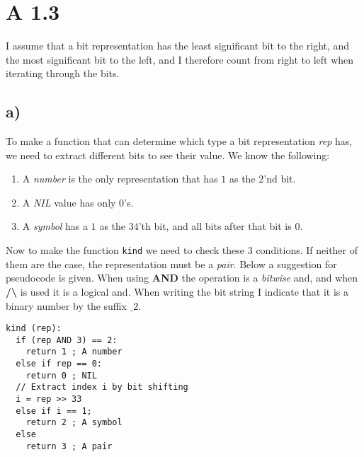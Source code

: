 \section*{A 1.3}
I assume that a bit representation has the least significant bit to the right, and the most significant bit to the left, and I therefore count from right to left when iterating through the bits.

\subsection*{a)}
To make a function that can determine which type a bit representation \textit{rep} has, we need to extract different bits to see their value. We know the following:
\begin{enumerate}
	\item A \textit{number} is the only representation that has $1$ as the $2$'nd bit.
	\item A \textit{NIL} value has only $0$'s.
	\item A \textit{symbol} has a $1$ as the $34$'th bit, and all bits after that bit is $0$.
\end{enumerate}
Now to make the function \texttt{kind} we need to check these $3$ conditions. If neither of them are the case, the representation must be a \textit{pair}. Below a suggestion for pseudocode is given. When using \textbf{AND} the operation is a \textit{bitwise} and, and when \textbf{/\textbackslash} is used it is a logical and. When writing the bit string I indicate that it is a binary number by the suffix $\_2$.
\begin{verbatim}
kind (rep):
  if (rep AND 3) == 2:
    return 1 ; A number
  else if rep == 0:
    return 0 ; NIL
  // Extract index i by bit shifting
  i = rep >> 33
  else if i == 1;
    return 2 ; A symbol
  else
    return 3 ; A pair 
\end{verbatim}

